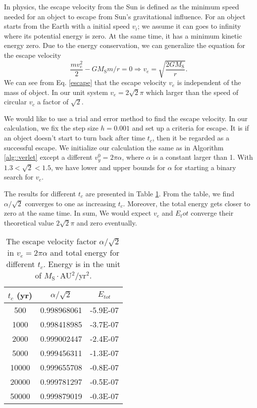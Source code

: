 In physics, the escape velocity from the Sun is defined as the minimum speed needed for an object to escape from Sun's gravitational influence.
For an object starts from the Earth with a initial speed $v_i$;
we assume it can goes to infinity where its potential energy is zero. 
At the same time, it has a minimum kinetic energy zero.
Due to the energy conservation, we can generalize the equation for the escape velocity
\begin{equation}
	\label{escape}
	\frac{mv_e^2}{2} - GM_{\mathrm{S}}m/r = 0\Longrightarrow v_e = \sqrt{\frac{2GM_{\mathrm{S}}}{r}}.
\end{equation}
We can see from Eq. \ref{escape} that the escape velocity $v_e$ is independent of the mass of object.
In our unit system $v_e = 2\sqrt{2}\pi$ which larger than the speed of circular $v_c$ a factor of $\sqrt{2}$.

We would like to use a trial and error method to find the escape velocity.
In our calculation, we fix the step size $h=0.001$ and set up a criteria for escape.
It is if an object doesn't start to turn back after time $t_c$, then it be regarded as a successful escape.
We initialize our calculation the same as in Algorithm \ref{alg::verlet} except a different $v_{y}^0=2\pi \alpha$, where $\alpha$ is a constant larger than 1.
With $1.3<\sqrt{2}<1.5$, we have lower and upper bounds for $\alpha$ for starting a binary search for $v_e$.

The results for different $t_c$ are presented in Table \ref{tab::escape}. 
From the table, we find $\alpha/\sqrt{2}$ converges to one as increasing $t_c$. 
Moreover, the total energy gets closer to zero at the same time.
In sum, We would expect $v_e$ and $E_tot$ converge their theoretical value $2\sqrt{2}\pi$ and zero eventually. 

\begin{table}[tb]
	\centering
	\caption{The escape velocity factor $\alpha/\sqrt{2}$ in $v_e=2\pi \alpha$ and total energy for different $t_c$.
	Energy is in the unit of $M_{\mathrm{S}}\cdot$AU$^2/$yr$^2$. }
	\label{tab::escape}
	\begin{tabular}{ccc}
	\hline
	\hline
	$t_c$ (yr)  & $\alpha/\sqrt{2}$          & $E_{tot}$          \\
	\hline
	500   & 0.998968061 & -5.9E-07 \\
	1000  & 0.998418985 & -3.7E-07 \\
	2000  & 0.999002447 & -2.4E-07 \\
	5000  & 0.999456311 & -1.3E-07 \\
	10000 & 0.999655708 & -0.8E-07 \\
	20000 & 0.999781297 & -0.5E-07 \\
	50000 & 0.999879019 & -0.3E-07\\
	\hline
	\hline
	\end{tabular}
\end{table}
	
